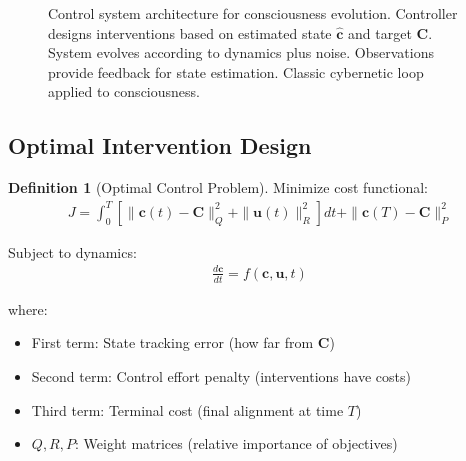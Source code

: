 \documentclass[11pt,a4paper]{article}
\theoremstyle{definition}
\newtheorem{definition}{Definition}[section]
\theoremstyle{remark}
\newcommand{\cc}{\mathbf{c}}
\begin{document}
\begin{small}
\begin{enumerate}
\begin{figure}[H]
\caption{Control system architecture for consciousness evolution. Controller designs interventions based on estimated state \(\hat{\cc}\) and target \(\mathbf{C}\). System evolves according to dynamics plus noise. Observations provide feedback for state estimation. Classic cybernetic loop applied to consciousness.}
\label{fig:control_system}
\end{figure}

\subsection{Optimal Intervention Design}

\begin{definition}[Optimal Control Problem]
Minimize cost functional:
\begin{align}
J = \int_0^T \left[\|\cc(t) - \mathbf{C}\|_Q^2 + \|\mathbf{u}(t)\|_R^2\right] dt + \|\cc(T) - \mathbf{C}\|_P^2
\end{align}

Subject to dynamics:
\begin{align}
\frac{d\cc}{dt} = f(\cc, \mathbf{u}, t)
\end{align}

where:
\begin{itemize}
    \item First term: State tracking error (how far from \(\mathbf{C}\))
    \item Second term: Control effort penalty (interventions have costs)
    \item Third term: Terminal cost (final alignment at time \(T\))
    \item \(Q, R, P\): Weight matrices (relative importance of objectives)
\end{itemize}


\end{definition}
\end{enumerate}
\end{small}
\end{document}
